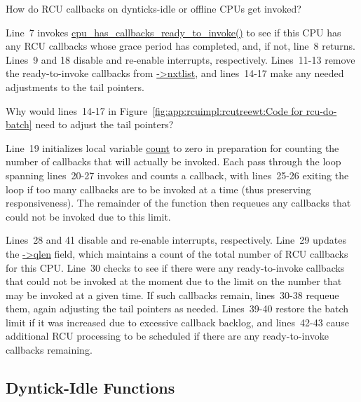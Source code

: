 \QuickQuiz{}
	How do RCU callbacks on dynticks-idle or offline CPUs
	get invoked?
 \QuickQuizEnd

Line~7 invokes \url{cpu_has_callbacks_ready_to_invoke()} to see if
this CPU has any RCU callbacks whose grace period has completed,
and, if not, line~8 returns.
Lines~9 and 18 disable and re-enable interrupts, respectively.
Lines~11-13 remove the ready-to-invoke callbacks from \url{->nxtlist},
and lines~14-17 make any needed adjustments to the tail pointers.

\QuickQuiz{}
	Why would lines~14-17 in
	Figure~\ref{fig:app:rcuimpl:rcutreewt:Code for rcu-do-batch}
	need to adjust the tail pointers?
 \QuickQuizEnd

Line~19 initializes local variable \url{count} to zero in preparation
for counting the number of callbacks that will actually be invoked.
Each pass through the loop spanning lines~20-27 invokes and counts
a callback, with lines~25-26 exiting the loop if too many callbacks
are to be invoked at a time (thus preserving responsiveness).
The remainder of the function then requeues any callbacks that could
not be invoked due to this limit.

Lines~28 and 41 disable and re-enable interrupts, respectively.
Line~29 updates the \url{->qlen} field, which maintains a count
of the total number of RCU callbacks for this CPU.
Line~30 checks to see if there were any ready-to-invoke callbacks
that could not be invoked at the moment due to the limit on the
number that may be invoked at a given time.
If such callbacks remain, lines~30-38 requeue them, again adjusting
the tail pointers as needed.
Lines~39-40 restore the batch limit if it was increased due to
excessive callback backlog, and lines~42-43 cause additional RCU
processing to be scheduled if there are any ready-to-invoke
callbacks remaining.

\subsection{Dyntick-Idle Functions}
\label{app:rcuimpl:rcutreewt:Dyntick-Idle Functions}

